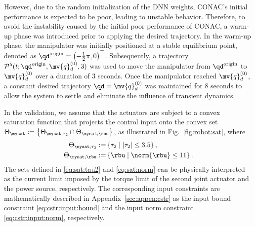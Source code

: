 \documentclass[letterpaper, journal]{IEEEtran}
\begin{document}
However, due to the random initialization of the DNN weights, CONAC's initial performance is expected to be poor, leading to unstable behavior.
Therefore, to avoid the instability caused by the initial poor performance of CONAC, a warm-up phase was introduced prior to applying the desired trajectory.
In the warm-up phase, the manipulator was initially positioned at a stable equilibrium point, denoted as ${\qd}^{\rm{origin}} = \left(-\tfrac{1}{2}\pi, 0\right)^\top$.
Subsequently, a trajectory $\mathcal{P}^5(t; {\qd}^{\rm{origin}}, \mv{q}_d^{(0)},3)$ was used to move the manipulator from ${\qd}^{\rm{origin}}$ to $\mv{q}_d^{(0)}$ over a duration of 3 seconds.
Once the manipulator reached $\mv{q}_d^{(0)}$, a constant desired trajectory $\qd = \mv{q}_d^{(0)}$ was maintained for 8 seconds to allow the system to settle and eliminate the influence of transient dynamics.

In the validation, we assume that the actuators are subject to a convex saturation function that projects the control input onto the convex set 
$
    \Theta_{\mysat} :=\left\{ \Theta_{\mysat, {\tau_2}} \cap \Theta_{\mysat, {\rbu}} \right\}
$, as illustrated in Fig.~\ref{fig:robot:sat}, where
\begin{subequations}
    \begin{align}
        \Theta_{\mysat, {\tau_2}}
        :=&
        \left\{
            \tau_2
            \mid
            \vert{\tau_2}\vert \le 
            3.5
        \right\}
        ,
        \label{eq:sat:tau2}
        \\    
        \Theta_{\mysat, {\rbu}}
        :=&
        \left\{
            \rbu
            \mid
            \norm{\rbu} \le 
            11
        \right\}
        .
        \label{eq:sat:norm}
    \end{align}
    \label{eq:sat}%
\end{subequations}
The sets defined in \eqref{eq:sat:tau2} and \eqref{eq:sat:norm} can be physically interpreted as the current limit imposed by the torque limit of the second joint actuator and the power source, respectively.
The corresponding input constraints are mathematically described in Appendix~\ref{sec:appen:cstr} as the input bound constraint \eqref{eq:cstr:input:bound} and the input norm constraint \eqref{eq:cstr:input:norm}, respectively.
\end{document}
